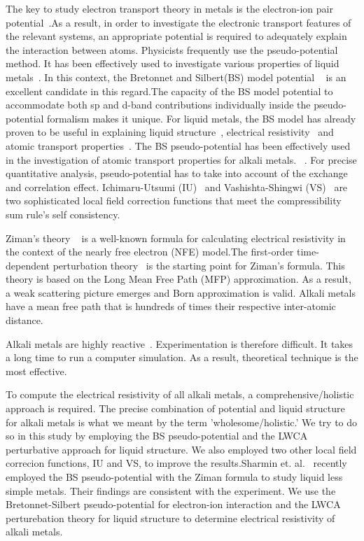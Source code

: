 \documentclass[final,12pt]{elsarticle}
\begin{document}
The key to study electron transport theory in metals is the electron-ion pair potential~\cite{Rossiter1991}.As a result, in order to investigate the electronic transport features of the relevant systems, an appropriate potential is required to adequately explain the interaction between atoms.
Physicists frequently use the pseudo-potential method.
It has been effectively used to investigate various properties of liquid metals~\cite{Fiolhais1996,Fiolhais1995,Sinclair1984,Daw1984,Walter1966,Hohenberg1964,Kohn1965,Mermin1965}. In this context, the Bretonnet and Silbert(BS) model potential ~\cite{Bret1992} is an excellent candidate in this regard.The capacity of the BS model potential to accommodate both sp and d-band contributions individually inside the pseudo-potential formalism makes it unique. For liquid metals, the BS model has already proven to be useful in explaining liquid structure~\cite{Zahid1999,Khaleque2002}, electrical resistivity~\cite{Sharmin2002} and atomic transport properties~\cite{Bhuiyan2003}. The BS pseudo-potential has been effectively used in the investigation of atomic transport properties for alkali metals. ~\cite{MSU2018}. For precise quantitative analysis, pseudo-potential has to take into account of the exchange and correlation effect. Ichimaru-Utsumi (IU)~\cite{ichimaru} and Vashishta-Shingwi (VS)~\cite{Vashishta1972} are two sophisticated local field correction functions that meet the compressibility sum rule's self consistency.

Ziman's theory ~\cite{ziman1961} is a well-known formula for calculating electrical resistivity in the context of the nearly free electron (NFE) model.The first-order time-dependent perturbation theory~\cite{Baym1964} is the starting point for Ziman's formula.
This theory is based on the Long Mean Free Path (MFP) approximation.
As a result, a weak scattering picture emerges and Born approximation is valid.
Alkali metals have a mean free path that is hundreds of times their respective inter-atomic distance.
 

Alkali metals are highly reactive~\cite{feitsma1975}. Experimentation is therefore difficult.
It takes a long time to run a computer simulation.
As a result, theoretical technique is the most effective. 

To compute the electrical resistivity of all alkali metals, a comprehensive/holistic approach is required.
The precise combination of potential and liquid structure for alkali metals is what we meant by the term 'wholesome/holistic.'
We try to do so in this study by employing the BS pseudo-potential and the LWCA perturbative approach for liquid structure.
We also employed two other local field correcion functions, IU and VS, to improve the results.Sharmin et. al.~\cite{Sharmin2002} recently employed the BS pseudo-potential with the Ziman formula to study liquid less simple metals.
Their findings are consistent with the experiment.
We use the Bretonnet-Silbert pseudo-potential for electron-ion interaction and the LWCA perturebation theory for liquid structure to determine electrical resistivity of alkali metals. 
\end{document}
